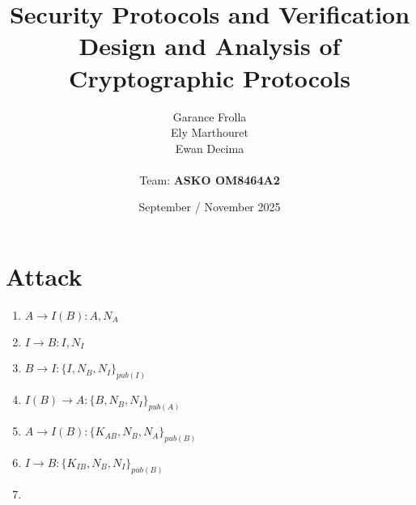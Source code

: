 \documentclass[11pt]{article}
\begin{document}
    \title{
            { \textbf{Security Protocols and Verification}} \\[1ex]
        {\small Design and Analysis of Cryptographic Protocols}
    }


    \author{
        Garance Frolla \\
        Ely Marthouret \\
        Ewan Decima\\ \\
        Team: \textbf{ASKO OM8464A2}
    }

    \date{September / November 2025}


    \maketitle
    \tableofcontents
    \newpage



    \section{Attack}

    \begin{enumerate}
        \item $A \rightarrow I(B) : A, N_A$
        \item $I \rightarrow B : I, N_I$
        \item $B \rightarrow I : \{I, N_B, N_I\}_{pub(I)}$
        \item $I(B) \rightarrow A : \{B, N_B, N_I\}_{pub(A)}$
        \item $A \rightarrow I(B) : \{K_{AB}, N_B, N_A\}_{pub(B)}$
        \item $I \rightarrow B : \{K_{IB}, N_B, N_I\}_{pub(B)}$
        \item
    \end{enumerate}
\end{document}
